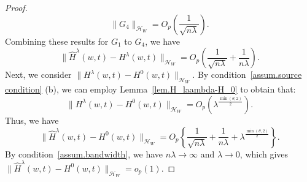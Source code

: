 \documentclass[
  12pt]{article}
\def\to{\rightarrow}
\begin{document}
\begin{proof}
$$
\| G_4\|_{\mathcal{H}_W}= O_p\left( \frac{1}{\sqrt{n\lambda}}\right).
$$
Combining these results for $G_1$ to $G_4$, we have
$$
\|\widehat{H}^{\lambda}(w,t)-H^{\lambda}(w,t)\|_{\mathcal{H}_{W}}=O_p\left( \frac{1}{\sqrt{n\lambda}} + \frac{1}{n\lambda} \right).
$$
Next, we consider $\|H^{\lambda}(w,t)-H^0(w,t)\|_{\mathcal{H}_{W}}$. By condition~\ref{assum.source condition} (b), we can employ Lemma~\ref{lem.H_laambda-H_0} to obtain that:
$$
\|H^{\lambda}(w,t)-H^0(w,t)\|_{\mathcal{H}_{W}}= O_p\left(\lambda^{\frac{\min(\theta,2)}{2}} \right).
$$
Thus, we have
$$
\|\widehat{H}^{\lambda}(w,t)-H^0(w,t)\|_{\mathcal{H}_{W}}=O_p\left\{ \frac{1}{\sqrt{n\lambda}}+ \frac{1}{n\lambda}+\lambda^{\frac{\min(\theta,2)}{2}}\right\}.
$$
By condition~\ref{assum.bandwidth}, we have $n\lambda \to \infty$ and $\lambda \to 0$, which gives $\|\widehat{H}^{\lambda}(w,t)-H^0(w,t)\|_{\mathcal{H}_{W}}=o_p(1)$. 
\end{proof}
\end{document}
